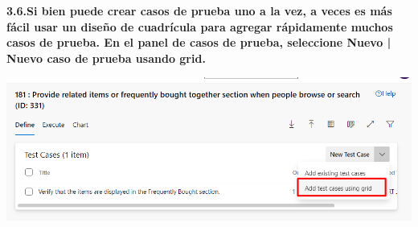\documentclass{article}
\begin{document}
\newpage
\textbf{3.6.Si bien puede crear casos de prueba uno a la vez, a veces es más fácil usar un diseño de cuadrícula para agregar rápidamente muchos casos de prueba. En el panel de casos de prueba, seleccione Nuevo | Nuevo caso de prueba usando grid.}

    \begin{center}
		\includegraphics[width=14cm]{./images/3.6} 
	\end{center}
	
	
\end{document}

